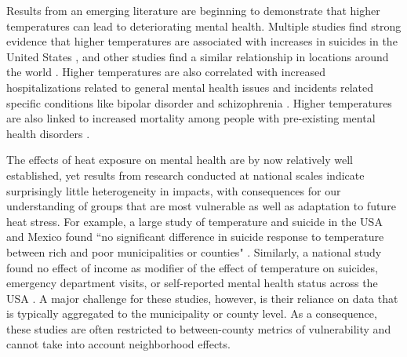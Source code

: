\documentclass[fleqn,10pt]{wlscirep}
\begin{document}
Results from an emerging literature are beginning to demonstrate that higher temperatures can lead to deteriorating mental health.  Multiple studies find strong evidence that higher temperatures are associated with increases in suicides in the United States \cite{Burke2018Aug, Mullins2019Dec, Dixon2007May}, and other studies find a similar relationship in locations around the world \cite{Qi2014Dec, Page2007Aug, Likhvar2011Jan}. Higher temperatures are also correlated with increased hospitalizations related to general mental health issues \cite{Obradovich2018Oct, Mullins2019Dec} and incidents related specific conditions like bipolar disorder and schizophrenia \cite{Lee2007Jan, Sung2013Feb}. Higher temperatures are also linked to increased mortality among people with pre-existing mental health disorders \cite{Hansen2008Oct}.

The effects of heat exposure on mental health are by now relatively well established, yet results from research conducted at national scales indicate surprisingly little heterogeneity in impacts, with consequences for our understanding of groups that are most vulnerable as well as adaptation to future heat stress. For example, a large study of temperature and suicide in the USA and Mexico found ``no significant difference in suicide response to temperature between rich and poor municipalities or counties" \cite{Burke2018Aug}. Similarly, a national study found no effect of income as modifier of the effect of temperature on suicides, emergency department visits, or self-reported mental health status across the USA \cite{Mullins2019Dec}. A major challenge for these studies, however, is their reliance on data that is typically aggregated to the municipality or county level.  As a consequence, these studies are often restricted to between-county metrics of vulnerability and cannot take into account neighborhood effects.
\end{document}
